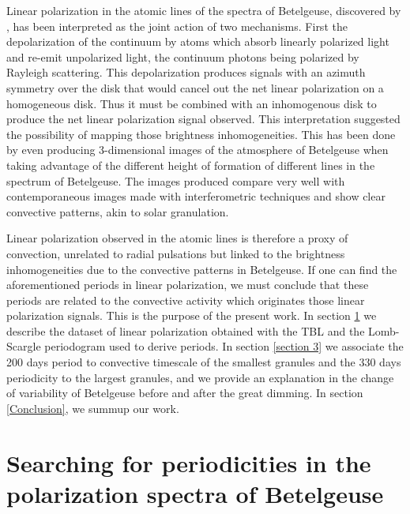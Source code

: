 \documentclass{aa}
\begin{document}
Linear polarization in the atomic lines of the spectra of Betelgeuse, discovered by \cite{auriere_discovery_2016}, has been interpreted as the joint action of 
two mechanisms. First the depolarization of the continuum by atoms which absorb linearly polarized light and re-emit unpolarized light, the 
continuum photons being polarized by Rayleigh scattering. This depolarization produces signals with an azimuth symmetry over the disk that 
would  cancel out the net linear polarization on a homogeneous disk. Thus it must be combined with an inhomogenous disk to produce the net linear polarization 
signal observed. This interpretation suggested the possibility of mapping those brightness inhomogeneities. This has been done by \cite{lopez_ariste_convective_2018} 
even producing 3-dimensional images of the atmosphere of Betelgeuse \citep{lopez_ariste_three-dimensional_2022} when taking advantage of the different height of formation of 
different lines in the spectrum of Betelgeuse. The images produced compare very well with contemporaneous images made with interferometric 
techniques \citep{montarges_close_2016} and show clear convective patterns, akin to solar granulation.\

Linear polarization observed in the atomic lines is therefore a proxy of convection, unrelated to radial 
pulsations but linked to the brightness inhomogeneities due to the convective patterns in Betelgeuse. If one can find the aforementioned periods 
in linear polarization, we must conclude that these periods are related to the convective activity which originates those linear polarization signals.
This is the purpose of the present work. In section \ref{Section 2} we describe the dataset of linear polarization obtained with the TBL and the Lomb-Scargle periodogram used to derive periods. In section \ref{section 3} we associate the 200 days period to convective timescale of the smallest granules and the 330 days periodicity to the largest granules, and we provide an explanation in the change of variability of Betelgeuse before and after the great dimming. In section \ref{Conclusion}, we summup our work.


\section{Searching for periodicities in the polarization spectra of Betelgeuse}
\label{Section 2}
\end{document}
